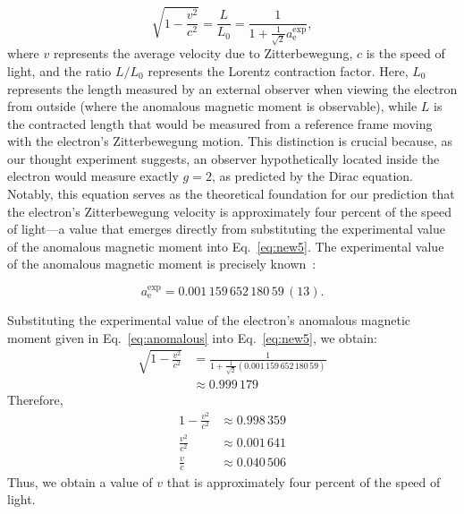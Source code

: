 \documentclass[%
 reprint,
 amsmath,amssymb,
 aps,
]{revtex4-1}
\numberwithin{equation}{section}%
\begin{document}
\begin{equation}
\sqrt{1 - \frac{v^2}{c^2}} = \frac{L}{L_0} = \frac{1}{1 + \frac{1}{\sqrt{2}}a^{\text{exp}}_{\text{e}}} ,
\label{eq:new5}
\end{equation}
where $v$ represents the average velocity due to Zitterbewegung, $c$ is the speed of light, and the ratio $L/L_0$ represents the Lorentz contraction factor. Here, $L_0$ represents the length measured by an external observer when viewing the electron from outside (where the anomalous magnetic moment is observable), while $L$ is the contracted length that would be measured from a reference frame moving with the electron's Zitterbewegung motion. This distinction is crucial because, as our thought experiment suggests, an observer hypothetically located inside the electron would measure exactly $g=2$, as predicted by the Dirac equation. Notably, this equation serves as the theoretical foundation for our prediction that the electron's Zitterbewegung velocity is approximately four percent of the speed of light---a value that emerges directly from substituting the experimental value of the anomalous magnetic moment into Eq.~\ref{eq:new5}. The experimental value of the anomalous magnetic moment is precisely known~\cite{Fan}:

\begin{equation}
a^{\text{exp}}_{\text{e}}=0.001\,159\,652\,180\,59\,(13) .
\label{eq:anomalous}
\end{equation}

Substituting the experimental value of the electron's anomalous magnetic moment given in Eq.~\ref{eq:anomalous} into Eq.~\ref{eq:new5}, we obtain:
\begin{align}
\sqrt{1 - \frac{v^2}{c^2}} &= \frac{1}{1 + \frac{1}{\sqrt{2}}(0.001\,159\,652\,180\,59)} \nonumber \\
&\approx 0.999\,179 \nonumber
\end{align}
Therefore,
\begin{align}
1 - \frac{v^2}{c^2} &\approx 0.998\,359 \nonumber \\
\frac{v^2}{c^2} &\approx 0.001\,641 \nonumber \\
\frac{v}{c} &\approx 0.040\,506 \nonumber
\end{align}
Thus, we obtain a value of $v$ that is approximately four percent of the speed of light.
\end{document}
